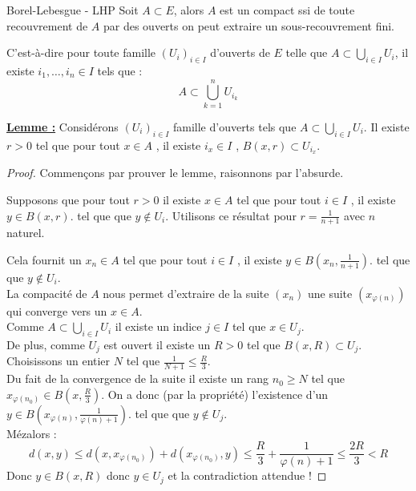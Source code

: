 \begin{definition}{Borel-Lebesgue - LHP}{}
    Soit $A \subset E$, alors
    $A$ est un compact ssi de toute recouvrement de $A$ par des ouverts on peut extraire un sous-recouvrement fini.

    C'est-à-dire pour toute famille $(U_i)_{i \in I}$ d'ouverts de $E$ 
    telle que $\displaystyle A \subset \bigcup_{i \in I} U_i$, il existe $i_1, \ldots, i_n \in I$ tels que :
    \[A \subset \bigcup_{k=1}^n U_{i_k}\]
\end{definition}

\uline{{\bf Lemme  :}}
Considérons $(U_i)_{i \in I}$ famille d'ouverts tels que $A \subset \bigcup_{i \in I} U_i$.
 Il existe $r>0$ tel que pour tout $x\in A$ , il existe $i_{x} \in I$ , $B(x,r) \subset U_{i_x}$.

\begin{proof}
Commençons par prouver le lemme, raisonnons par l'absurde.

Supposons que pour tout $r>0$ il existe $x\in A$ tel que pour tout $i \in I$ , il existe $y\in B(x,r)$. tel que que $y \notin U_i$.
Utilisons ce résultat pour $r=\frac 1{n+1}$ avec $n$ naturel.

Cela fournit un $x_n \in A$ tel que pour tout $i \in I$ , il existe $y\in B\left(x_n,\frac 1{n+1}\right)$. tel que que $y \notin U_i$. \\

La compacité de $A$ nous permet d'extraire de la suite $(x_n)$ une suite $(x_{\varphi(n)})$ qui converge vers un $x\in A$.\\

Comme $A \subset \bigcup_{i \in I} U_i$ il existe un indice $j \in I$ tel que $x \in U_j$.\\
De plus,  comme $U_j$ est ouvert il existe un $R>0$ tel que $B(x,R) \subset U_j$.\\

Choisissons un entier $N$ tel que $\frac 1{N+1}\leqslant \frac R 3$.\\
Du fait de la convergence de la suite il existe un rang $n_0\geqslant N $ tel que $x_{\varphi(n_0)} \in B\left(x,\frac R 3\right)$.
On a donc (par la propriété) l'existence d'un $y \in B\left(x_{\varphi(n)},\frac 1{\varphi(n)+1}\right)$. tel que que $y \notin U_j$.\\
Mézalors :
\[d(x,y) \leqslant d(x,x_{\varphi(n_0)})+d(x_{\varphi(n_0)},y) \leqslant \frac R 3 + \frac 1{\varphi(n)+1}\leqslant \frac {2R}3 <R\]
Donc $y \in B(x,R)$ donc $y \in U_j$ et la contradiction attendue !
\end{proof}


